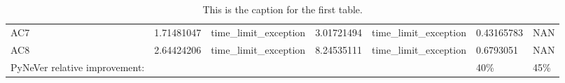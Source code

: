 \begin{table}[]
{\begin{tabular}{@{}lllllll@{}}
    AC7     & {\color[HTML]{ACB9CA} 1.71481047} & {\color[HTML]{ACB9CA} time\_limit\_exception} & {\color[HTML]{ACB9CA} 3.01721494} & {\color[HTML]{ACB9CA} time\_limit\_exception} & {\color[HTML]{ACB9CA} 0.43165783} & {\color[HTML]{ACB9CA} NAN}        \\
    AC8     & {\color[HTML]{ACB9CA} 2.64424206} & {\color[HTML]{ACB9CA} time\_limit\_exception} & {\color[HTML]{ACB9CA} 8.24535111} & {\color[HTML]{ACB9CA} time\_limit\_exception} & {\color[HTML]{ACB9CA} 0.6793051}  & {\color[HTML]{ACB9CA} NAN}        \\ \cmidrule(r){1-7}
    PyNeVer relative improvement:        &                                   &                                               &                                   &                                               & {\color[HTML]{FF0000} 40\%}       & {\color[HTML]{FF0000} 45\%}       \\ \cmidrule(r){1-7}
    \end{tabular}%
    }
    \caption{This is the caption for the first table.}
    \label{table:AC}
\end{table}

